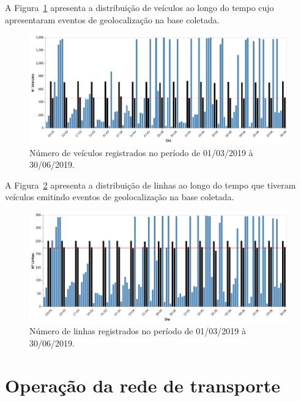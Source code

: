 A Figura~\ref{fig:veículosregistrados} apresenta a distribuição de veículos ao longo do tempo cujo apresentaram eventos de geolocalização na base coletada.

\begin{figure}
\centering
\includegraphics[width=.9\textwidth]{Capitulo4/img/veiculos.png}
\caption{Número de veículos registrados no período de 01/03/2019 à 30/06/2019.}
\label{fig:veículosregistrados}
\end{figure}


A Figura~\ref{fig:linhasregistradas} apresenta a distribuição de linhas ao longo do tempo que tiveram veículos emitindo eventos de geolocalização na base coletada.
\begin{figure}
\centering
\includegraphics[width=.9\textwidth]{Capitulo4/img/linhas-registradas.png}
\caption{Número de linhas registrados no período de 01/03/2019 à 30/06/2019.}
\label{fig:linhasregistradas}
\end{figure}




\section{Operação da rede de transporte}




